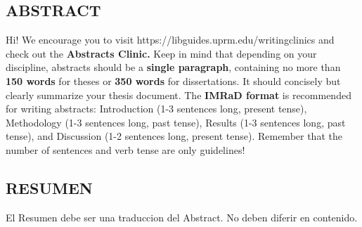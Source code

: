 



\vspace*{0.5in}
\begin{center}
\section*{ABSTRACT}
\end{center}

\noindent
Hi! We encourage you to visit https://libguides.uprm.edu/writingclinics and check out the \textbf{Abstracts Clinic.} Keep in mind that depending on your discipline, abstracts should be a \textbf{single paragraph}, containing no more than \textbf{150 words} for theses or \textbf{350 words} for dissertations. It should concisely but clearly summarize your thesis document. The \textbf{IMRaD format} is recommended for writing abstracts: Introduction (1-3 sentences long, present tense), Methodology (1-3 sentences long, past tense), Results (1-3 sentences long, past tense), and Discussion (1-2 sentences long, present tense). Remember that the number of sentences and verb tense are only guidelines!







\newpage





\vspace*{0.5in}
\begin{center}
\section*{RESUMEN}
\end{center}

\noindent
El Resumen debe ser una traduccion del Abstract. No deben diferir en contenido. %
